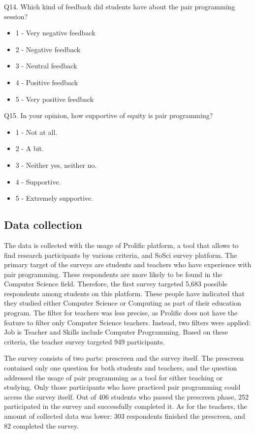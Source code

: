 \documentclass[conference]{IEEEtran}
\begin{document}
Q14. Which kind of feedback did students have about the pair programming session?
    \begin{itemize}
        \item 1 - Very negative feedback
        \item 2 - Negative feedback
        \item 3 - Neutral feedback
        \item 4 - Positive feedback
        \item 5 - Very positive feedback
    \end{itemize}

Q15. In your opinion, how supportive of equity is pair programming?
    \begin{itemize}
        \item 1 - Not at all.
        \item 2 - A bit.
        \item 3 - Neither yes, neither no.
        \item 4 - Supportive.
        \item 5 - Extremely supportive.
    \end{itemize}

\subsection{Data collection}

The data is collected with the usage of Prolific platform, a tool that allows to find research participants by various criteria, and SoSci survey platform. The primary target of the surveys are students and teachers who have experience with pair programming. These respondents are more likely to be found in the Computer Science field. Therefore, the first survey targeted 5,683 possible respondents among students on this platform. These people have indicated that they studied either Computer Science or Computing as part of their education program. The filter for teachers was less precise, as Prolific does not have the feature to filter only Computer Science teachers. Instead, two filters were applied: Job is Teacher and Skills include Computer Programming. Based on these criteria, the teacher survey targeted 949 participants.

The survey consists of two parts: prescreen and the survey itself. The prescreen contained only one question for both students and teachers, and the question addressed the usage of pair programming as a tool for either teaching or studying. Only those participants who have practiced pair programming could access the survey itself. Out of 406 students who passed the prescreen phase, 252 participated in the survey and successfully completed it. As for the teachers, the amount of collected data was lower: 303 respondents finished the prescreen, and 82 completed the survey.
\end{document}

